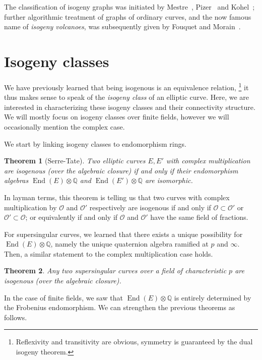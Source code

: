 \documentclass[10pt]{article}
\theoremstyle{plain}
\newtheorem{theorem}{Theorem}
\theoremstyle{definition}
\DeclareMathOperator{\End}{End} %
\def\O{\ensuremath{\mathcal{O}}}
\begin{document}
The classification of isogeny graphs was initiated by
Mestre~\cite{mestre86}, Pizer~\cite{pizer1,pizer2} and
Kohel~\cite{kohel}; further algorithmic treatment of graphs of
ordinary curves, and the now famous name of \emph{isogeny volcanoes},
was subsequently given by Fouquet and
Morain~\cite{fouquet+morain02}. %


\section{Isogeny classes}

We have previously learned that being isogenous is an equivalence
relation,%
\footnote{Reflexivity and transitivity are obvious, symmetry is
  guaranteed by the dual isogeny theorem.} %
it thus makes sense to speak of the \emph{isogeny class} of an elliptic
curve. %
Here, we are interested in characterizing these isogeny classes and
their connectivity structure. %
We will mostly focus on isogeny classes over finite fields, however we
will occasionally mention the complex case.

We start by linking isogeny classes to endomorphism rings.

\begin{theorem}[Serre-Tate]
  \label{th:serre-tate}
  Two elliptic curves $E,E'$ with complex multiplication are isogenous
  (over the algebraic closure) if and only if their \emph{endomorphism
    algebras} $\End(E)⊗ℚ$ and $\End(E')⊗ℚ$ are isomorphic.
\end{theorem}

In layman terms, this theorem is telling us that two curves with
complex multiplication by $\O$ and $\O'$ respectively are isogenous
if and only if $\O⊂\O'$ or $\O'⊂\O$; or equivalently if and only if
$\O$ and $\O'$ have the same field of fractions.

For supersingular curves, we learned that there exists a unique
possibility for $\End(E)⊗ℚ$, namely the unique quaternion algebra
ramified at $p$ and $∞$. %
Then, a similar statement to the complex multiplication case holds.

\begin{theorem}
  \label{th:ssingular-serre-tate}
  Any two supersingular curves over a field of characteristic $p$ are
  isogenous (over the algebraic closure).
\end{theorem}

In the case of finite fields, we saw that $\End(E)⊗ℚ$ is entirely
determined by the Frobenius endomorphism. %
We can strengthen the previous theorems as follows.
\end{document}
